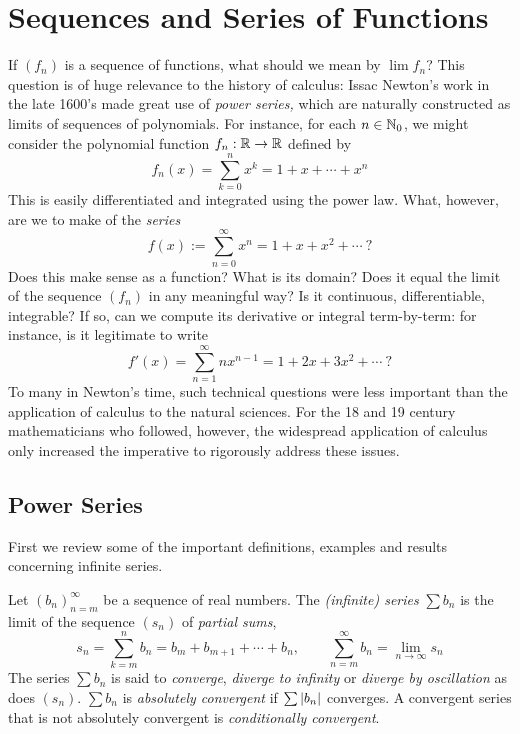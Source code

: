 \graphicspath{{2series/asy/}}

\section{Sequences and Series of Functions}

If $(f_n)$ is a sequence of functions, what should we mean by $\lim f_n$? This question is of huge relevance to the history of calculus: Issac Newton's work in the late 1600's made great use of \emph{power series,} which are naturally constructed as limits of sequences of polynomials.\medbreak
For instance, for each $n\in\mathbb{N}_0$, we might consider the polynomial function $f_n:\mathbb{R}\to\mathbb{R}$ defined by
\[
	f_n(x)=\sum_{k=0}^nx^k=1+x+\cdots+x^n
\]
This is easily differentiated and integrated using the power law. What, however, are we to make of the \emph{series}
\[
	f(x):=\sum_{n=0}^\infty x^n=1+x+x^2+\cdots\ \text{?}
\]
Does this make sense as a function? What is its domain? Does it equal the limit of the sequence $(f_n)$ in any meaningful way? Is it continuous, differentiable, integrable? If so, can we compute its derivative or integral term-by-term: for instance, is it legitimate to write
\[
	f'(x)=\sum_{n=1}^\infty nx^{n-1}=1+2x+3x^2+\cdots\ \text{?}
\]
To many in Newton's time, such technical questions were less important than the application of calculus to the natural sciences. For the 18\th{} and 19\th{} century mathematicians who followed, however, the widespread application of calculus only increased the imperative to rigorously address these issues. 


\setcounter{subsection}{22}
\subsection{Power Series}

First we review some of the important definitions, examples and results concerning infinite series.

\begin{defn}{}{}
	Let $(b_n)_{n=m}^\infty$ be a sequence of real numbers. The \emph{(infinite) series} $\sum b_n$ is the limit of the sequence $(s_n)$ of \emph{partial sums},
	\[
		s_n=\sum_{k=m}^nb_n=b_m+b_{m+1}+\cdots+b_n,\qquad 
		\sum_{n=m}^\infty b_n=\lim_{n\to\infty}s_n
	\]
	The series $\sum b_n$ is said to \emph{converge}, \emph{diverge to infinity} or \emph{diverge by oscillation\footnotemark} as does $(s_n)$.\smallbreak
	$\sum b_n$ is \emph{absolutely convergent} if $\sum\left| b_n\right|$ converges. A convergent series that is not absolutely convergent is \emph{conditionally convergent}.
\end{defn}

